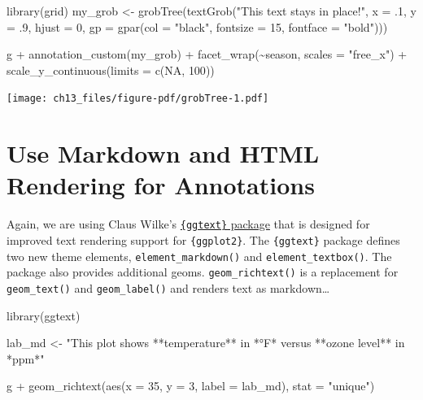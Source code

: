 \documentclass[
  letterpaper,
  DIV=11,
  numbers=noendperiod]{scrreprt}
\newenvironment{Shaded}{\begin{snugshade}}{\end{snugshade}}
\newcommand{\AttributeTok}[1]{\textcolor[rgb]{0.40,0.45,0.13}{#1}}
\newcommand{\ConstantTok}[1]{\textcolor[rgb]{0.56,0.35,0.01}{#1}}
\newcommand{\DecValTok}[1]{\textcolor[rgb]{0.68,0.00,0.00}{#1}}
\newcommand{\FunctionTok}[1]{\textcolor[rgb]{0.28,0.35,0.67}{#1}}
\newcommand{\NormalTok}[1]{\textcolor[rgb]{0.00,0.23,0.31}{#1}}
\newcommand{\OtherTok}[1]{\textcolor[rgb]{0.00,0.23,0.31}{#1}}
\newcommand{\SpecialCharTok}[1]{\textcolor[rgb]{0.37,0.37,0.37}{#1}}
\newcommand{\StringTok}[1]{\textcolor[rgb]{0.13,0.47,0.30}{#1}}
\begin{document}
\begin{Shaded}
\begin{Highlighting}[]
\FunctionTok{library}\NormalTok{(grid)}
\NormalTok{my\_grob }\OtherTok{\textless{}{-}} \FunctionTok{grobTree}\NormalTok{(}\FunctionTok{textGrob}\NormalTok{(}\StringTok{"This text stays in place!"}\NormalTok{,}
                             \AttributeTok{x =}\NormalTok{ .}\DecValTok{1}\NormalTok{, }\AttributeTok{y =}\NormalTok{ .}\DecValTok{9}\NormalTok{, }\AttributeTok{hjust =} \DecValTok{0}\NormalTok{,}
                             \AttributeTok{gp =} \FunctionTok{gpar}\NormalTok{(}\AttributeTok{col =} \StringTok{"black"}\NormalTok{,}
                                       \AttributeTok{fontsize =} \DecValTok{15}\NormalTok{,}
                                       \AttributeTok{fontface =} \StringTok{"bold"}\NormalTok{)))}

\NormalTok{g }\SpecialCharTok{+}
  \FunctionTok{annotation\_custom}\NormalTok{(my\_grob) }\SpecialCharTok{+}
  \FunctionTok{facet\_wrap}\NormalTok{(}\SpecialCharTok{\textasciitilde{}}\NormalTok{season, }\AttributeTok{scales =} \StringTok{"free\_x"}\NormalTok{) }\SpecialCharTok{+}
  \FunctionTok{scale\_y\_continuous}\NormalTok{(}\AttributeTok{limits =} \FunctionTok{c}\NormalTok{(}\ConstantTok{NA}\NormalTok{, }\DecValTok{100}\NormalTok{))}
\end{Highlighting}
\end{Shaded}

\texttt{[image: ch13\_files/figure-pdf/grobTree-1.pdf]}

\section{Use Markdown and HTML Rendering for
Annotations}\label{use-markdown-and-html-rendering-for-annotations}

Again, we are using Claus Wilke's
\href{https://wilkelab.org/ggtext/}{\texttt{\{ggtext\}} package} that is
designed for improved text rendering support for \texttt{\{ggplot2\}}.
The \texttt{\{ggtext\}} package defines two new theme elements,
\texttt{element\_markdown()} and \texttt{element\_textbox()}. The
package also provides additional geoms. \texttt{geom\_richtext()} is a
replacement for \texttt{geom\_text()} and \texttt{geom\_label()} and
renders text as markdown\ldots{}

\begin{Shaded}
\begin{Highlighting}[]
\FunctionTok{library}\NormalTok{(ggtext)}

\NormalTok{lab\_md }\OtherTok{\textless{}{-}} \StringTok{"This plot shows **temperature** in *°F* versus **ozone level** in *ppm*"}

\NormalTok{g }\SpecialCharTok{+}
  \FunctionTok{geom\_richtext}\NormalTok{(}\FunctionTok{aes}\NormalTok{(}\AttributeTok{x =} \DecValTok{35}\NormalTok{, }\AttributeTok{y =} \DecValTok{3}\NormalTok{, }\AttributeTok{label =}\NormalTok{ lab\_md),}
                \AttributeTok{stat =} \StringTok{"unique"}\NormalTok{)}
\end{Highlighting}
\end{Shaded}
\end{document}
